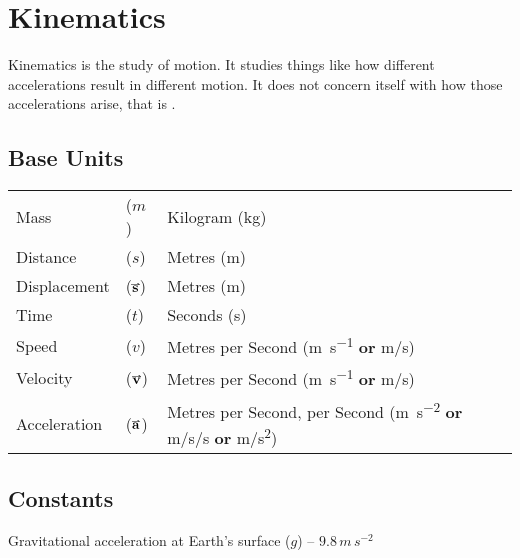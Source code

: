 \documentclass[main.tex]{subfiles}
\begin{document}
    
    \chapter{Kinematics}
        \label{ch: Kinematics}
        \thispagestyle{noheader}

        Kinematics is the study of motion. It studies things like how different accelerations result in different motion. It does not concern itself with how those accelerations arise, that is .

        \section{Base Units}
            \label{sec: Base Units Kinematics}

            \begin{table}[!h]
                \noindent\begin{tabular}{@{} p{40mm} C{10mm} p{110mm}}
                    Mass &($m$) &Kilogram (\si{\kilo\gram})\\[\tablegap]
                    Distance &($s$) &Metres (\si{\metre})\\[\tablegap]
                    Displacement &($\vect{s}$) &Metres (\si{\metre})\\[\tablegap]
                    Time &($t$) &Seconds (\si{\second})\\[\tablegap]
                    Speed &($v$) &Metres per Second (\si{\metre \per\second} \textbf{or} \si{\metre / \second})\\[\tablegap]
                    Velocity &($\vect{v}$) &Metres per Second (\si{\metre \per\second} \textbf{or} \si{\metre / \second})\\[\tablegap]
                    Acceleration &($\vect{a}$) &Metres per Second, per Second (\si{\metre \per\second\squared} \textbf{or} \si{\metre /\second /\second} \textbf{or} \si{\metre / \second\squared})\\[\tablegap]
                \end{tabular}
            \end{table}

        \section{Constants}
            \label{sec: Constants Kinematics}

            Gravitational acceleration at Earth's surface ($g$) -- $9.8\, m\,s^{-2}$
\end{document}
